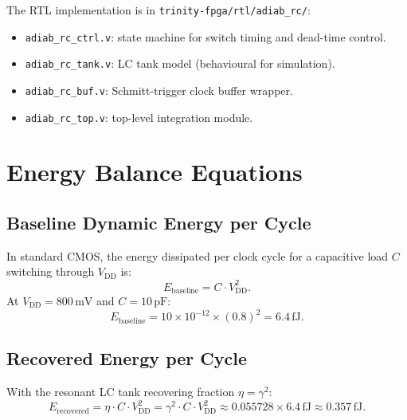 The RTL implementation is in \texttt{trinity-fpga/rtl/adiab\_rc/}:
\begin{itemize}
  \item \texttt{adiab\_rc\_ctrl.v}: state machine for switch timing and
        dead-time control.
  \item \texttt{adiab\_rc\_tank.v}: LC tank model (behavioural for simulation).
  \item \texttt{adiab\_rc\_buf.v}: Schmitt-trigger clock buffer wrapper.
  \item \texttt{adiab\_rc\_top.v}: top-level integration module.
\end{itemize}

\section{Energy Balance Equations}
\label{sec:energy-balance-w46}

\subsection{Baseline Dynamic Energy per Cycle}

In standard CMOS, the energy dissipated per clock cycle for a capacitive load
$C$ switching through $V_{\mathrm{DD}}$ is:
\begin{equation}\label{eq:e-baseline}
  E_{\mathrm{baseline}} = C \cdot V_{\mathrm{DD}}^{2}.
\end{equation}
At $V_{\mathrm{DD}} = 800\,\text{mV}$ and $C = 10\,\text{pF}$:
\begin{equation}
  E_{\mathrm{baseline}} = 10 \times 10^{-12} \times (0.8)^{2}
  = 6.4\,\text{fJ}.
\end{equation}

\subsection{Recovered Energy per Cycle}

With the resonant LC tank recovering fraction $\eta = \gamma^{2}$:
\begin{equation}\label{eq:e-recovered}
  E_{\mathrm{recovered}} = \eta \cdot C \cdot V_{\mathrm{DD}}^{2}
  = \gamma^{2} \cdot C \cdot V_{\mathrm{DD}}^{2}
  \approx 0.055728 \times 6.4\,\text{fJ}
  \approx 0.357\,\text{fJ}.
\end{equation}

